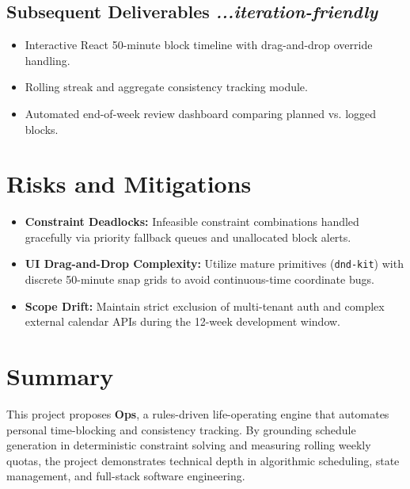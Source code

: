\documentclass[11pt,a4paper]{article}
\begin{document}
\subsection{Subsequent Deliverables \textit{...iteration-friendly}}
\begin{itemize}
    \item Interactive React 50-minute block timeline with drag-and-drop override handling.
    \item Rolling streak and aggregate consistency tracking module.
    \item Automated end-of-week review dashboard comparing planned vs. logged blocks.
\end{itemize}

\section{Risks and Mitigations}
\begin{itemize}
    \item \textbf{Constraint Deadlocks:} Infeasible constraint combinations handled gracefully via priority fallback queues and unallocated block alerts.
    \item \textbf{UI Drag-and-Drop Complexity:} Utilize mature primitives (\texttt{dnd-kit}) with discrete 50-minute snap grids to avoid continuous-time coordinate bugs.
    \item \textbf{Scope Drift:} Maintain strict exclusion of multi-tenant auth and complex external calendar APIs during the 12-week development window.
\end{itemize}

\section{Summary}
This project proposes \textbf{Ops}, a rules-driven life-operating engine that automates personal time-blocking and consistency tracking. By grounding schedule generation in deterministic constraint solving and measuring rolling weekly quotas, the project demonstrates technical depth in algorithmic scheduling, state management, and full-stack software engineering.
\end{document}
